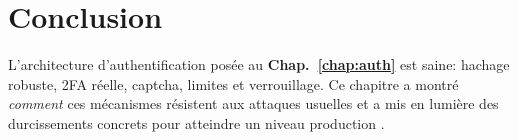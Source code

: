\section{Conclusion}
\noindent L'architecture d'authentification posée au \textbf{Chap.~\ref{chap:auth}} est saine: hachage robuste, 2FA réelle, captcha, limites et verrouillage. Ce chapitre a montré \emph{comment} ces mécanismes résistent aux attaques usuelles et a mis en lumière des durcissements concrets pour atteindre un niveau \og production \fg{}.

